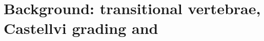 
\section{Background: transitional vertebrae, Castellvi grading and \VERIDAH{}}
\label{app:background}

